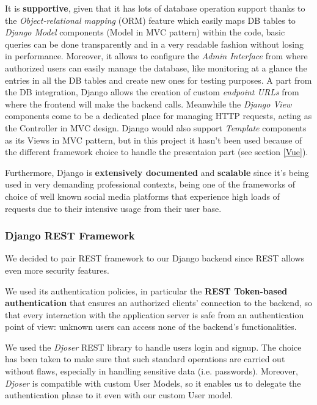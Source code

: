 \documentclass[table, 12pt]{article}
\begin{document}
It is \textbf{supportive}, given that it has lots of database operation support thanks to the \emph{Object-relational mapping} (ORM) feature which easily maps DB tables to \emph{Django Model} components (Model in MVC pattern) within the code, basic queries can be done transparently and in a very readable fashion without losing in performance.
Moreover, it allows to configure the \emph{Admin Interface} from where authorized users can easily manage the database, like monitoring at a glance the entries in all the DB tables and create new ones for testing purposes. A part from the DB integration,  Django allows the creation of custom \emph{endpoint URLs} from where the frontend will make the backend calls. Meanwhile the \emph{Django View} components come to be a dedicated place for managing HTTP requests, acting as the Controller in MVC design. Django would also support \emph{Template} components as its Views in MVC pattern, but in this project it hasn't been used because of the different framework choice to handle the presentaion part (see section \ref{Vue}).

Furthermore, Django is \textbf{extensively documented} and \textbf{scalable} since it's being used in very demanding professional contexts, being one of the frameworks of choice of well known social media platforms that experience high loads of requests due to their intensive usage from their user base.

\subsubsection{Django REST Framework}
\label{REST}
We decided to pair REST framework to our Django backend since REST allows even more security features.

We used its authentication policies, in particular the \textbf{REST Token-based authentication} that ensures an authorized clients' connection to the backend, so that every interaction with the application server is safe from an authentication point of view: unknown users can access none of the backend's functionalities.

We used the \emph{Djoser} REST library to handle users login and signup. The choice has been taken to make sure that such standard operations are carried out without flaws, especially in handling sensitive data (i.e. passwords). Moreover, \emph{Djoser} is compatible with custom User Models, so it enables us to delegate the authentication phase to it even with our custom User model.
\end{document}
